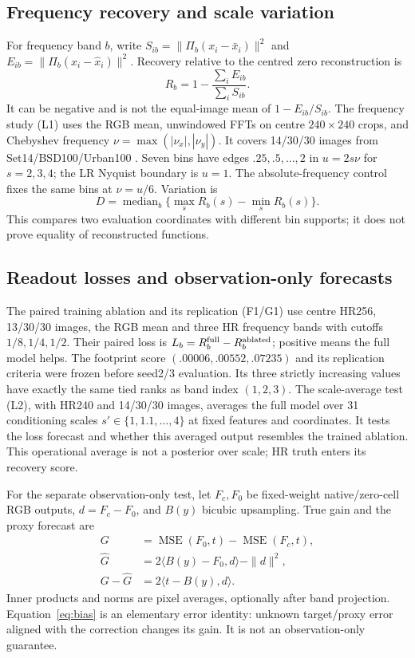 \subsection{Frequency recovery and scale variation}
For frequency band $b$, write $S_{ib}=\|\Pi_b(x_i-\bar x_i)\|^2$ and
$E_{ib}=\|\Pi_b(x_i-\hat x_i)\|^2$. Recovery relative to the centred zero
reconstruction is
\begin{equation}
 R_b=1-\frac{\sum_i E_{ib}}{\sum_i S_{ib}}.
 \label{eq:recovery}
\end{equation}
It can be negative and is not the equal-image mean of
$1-E_{ib}/S_{ib}$. The frequency study (L1) uses the RGB mean, unwindowed FFTs on centre
$240\times240$ crops, and Chebyshev frequency
$\nu=\max(|\nu_x|,|\nu_y|)$. It covers 14/30/30 images from
Set14/BSD100/Urban100 \cite{zeyde2010single,martin2001database,huang2015urban}.
Seven bins have edges $.25,.5,\ldots,2$ in $u=2s\nu$ for $s=2,3,4$;
the LR Nyquist boundary is $u=1$. The absolute-frequency control fixes
the same bins at $\nu=u/6$. Variation is
\begin{equation}
 D=\operatorname{median}_b\{\max_s R_b(s)-\min_s R_b(s)\}.
 \label{eq:variation}
\end{equation}
This compares two evaluation coordinates with different bin supports;
it does not prove equality of reconstructed functions.

\subsection{Readout losses and observation-only forecasts}
The paired training ablation and its replication (F1/G1) use centre HR256, 13/30/30 images, the RGB mean and three HR
frequency bands with cutoffs $1/8,1/4,1/2$. Their paired loss is
$L_b=R_b^{\rm full}-R_b^{\rm ablated}$; positive means the full model helps.
The footprint score $(.00006,.00552,.07235)$ and its replication criteria
were frozen before seed2/3 evaluation. Its three strictly increasing
values have exactly the same tied ranks as band index $(1,2,3)$.
The scale-average test (L2), with HR240 and 14/30/30 images, averages the full model over
31 conditioning scales $s'\in\{1,1.1,\ldots,4\}$ at fixed features and
coordinates. It tests the loss forecast and whether this averaged output
resembles the trained ablation. This operational average is not a
posterior over scale; HR truth enters its recovery score.

For the separate observation-only test, let $F_c,F_0$ be fixed-weight
native/zero-cell RGB outputs, $d=F_c-F_0$, and $B(y)$ bicubic upsampling.
True gain and the proxy forecast are
\begin{align}
 G&=\operatorname{MSE}(F_0,t)-\operatorname{MSE}(F_c,t),\\
 \hat G&=2\langle B(y)-F_0,d\rangle-\|d\|^2,\label{eq:proxy}\\
 G-\hat G&=2\langle t-B(y),d\rangle.\label{eq:bias}
\end{align}
Inner products and norms are pixel averages, optionally after band
projection. Equation~\eqref{eq:bias} is an elementary error identity:
unknown target/proxy error aligned with the correction changes its gain.
It is not an observation-only guarantee.

